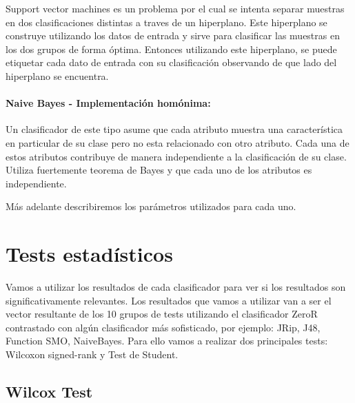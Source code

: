 \documentclass[11pt,a4paper,twoside]{tesis}
\begin{document}

Support vector machines es un problema por el cual se intenta separar muestras en dos clasificaciones distintas a traves de un hiperplano. Este hiperplano se construye utilizando los datos de entrada y sirve para clasificar las muestras en los dos grupos de forma óptima. Entonces utilizando este hiperplano, se puede etiquetar cada dato de entrada con su clasificación observando de que lado del hiperplano se encuentra.

\paragraph{Naive Bayes \cite{DBLP:conf/flairs/Zhang04} - Implementación homónima:}


Un clasificador de este tipo asume que cada atributo muestra una característica en particular de su clase pero no esta relacionado con otro atributo. Cada una de estos atributos contribuye de manera independiente a la clasificación de su clase. Utiliza fuertemente teorema de Bayes y que cada uno de los atributos es independiente. 

Más adelante describiremos los parámetros utilizados para cada uno.

\section{Tests estadísticos}

Vamos a utilizar los resultados de cada clasificador para ver si los resultados son significativamente relevantes. Los resultados que vamos a utilizar van a ser el vector resultante de los 10 grupos de tests utilizando el clasificador ZeroR contrastado con algún clasificador más sofisticado, por ejemplo: JRip, J48, Function SMO, NaiveBayes.
Para ello vamos a realizar dos principales tests: Wilcoxon signed-rank y Test de Student. 

\subsection{Wilcox Test}
\end{document}
